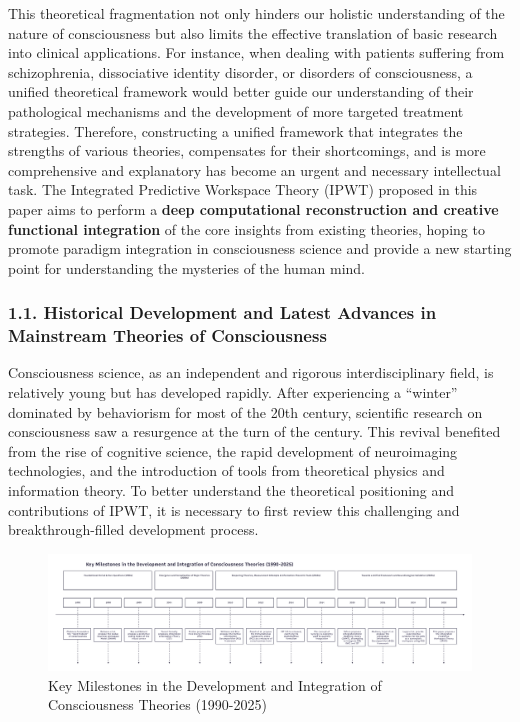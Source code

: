 \documentclass[
  a4paper]{article}
\begin{document}
This theoretical fragmentation not only hinders our holistic
understanding of the nature of consciousness but also limits the
effective translation of basic research into clinical applications. For
instance, when dealing with patients suffering from schizophrenia,
dissociative identity disorder, or disorders of consciousness, a unified
theoretical framework would better guide our understanding of their
pathological mechanisms and the development of more targeted treatment
strategies. Therefore, constructing a unified framework that integrates
the strengths of various theories, compensates for their shortcomings,
and is more comprehensive and explanatory has become an urgent and
necessary intellectual task. The Integrated Predictive Workspace Theory
(IPWT) proposed in this paper aims to perform a \textbf{deep
computational reconstruction and creative functional integration} of the
core insights from existing theories, hoping to promote paradigm
integration in consciousness science and provide a new starting point
for understanding the mysteries of the human mind.

\subsubsection{1.1. Historical Development and Latest Advances in
Mainstream Theories of
Consciousness}\label{historical-development-and-latest-advances-in-mainstream-theories-of-consciousness}

Consciousness science, as an independent and rigorous interdisciplinary
field, is relatively young but has developed rapidly. After experiencing
a ``winter'' dominated by behaviorism for most of the 20th century,
scientific research on consciousness saw a resurgence at the turn of the
century. This revival benefited from the rise of cognitive science, the
rapid development of neuroimaging technologies, and the introduction of
tools from theoretical physics and information theory. To better
understand the theoretical positioning and contributions of IPWT, it is
necessary to first review this challenging and breakthrough-filled
development process.

\begin{figure}
    \centering
    \includegraphics[width=\textwidth]{../images/timeline.png}
    \caption{Key Milestones in the Development and Integration of Consciousness Theories (1990-2025)}
    \label{fig:timeline}
\end{figure}
\end{document}

